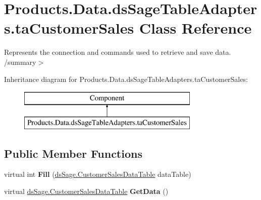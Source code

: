 \hypertarget{class_products_1_1_data_1_1ds_sage_table_adapters_1_1ta_customer_sales}{}\section{Products.\+Data.\+ds\+Sage\+Table\+Adapters.\+ta\+Customer\+Sales Class Reference}
\label{class_products_1_1_data_1_1ds_sage_table_adapters_1_1ta_customer_sales}


Represents the connection and commands used to retrieve and save data. /summary$>$  


Inheritance diagram for Products.\+Data.\+ds\+Sage\+Table\+Adapters.\+ta\+Customer\+Sales\+:\begin{figure}[H]
\begin{center}
\leavevmode
\includegraphics[height=2.000000cm]{class_products_1_1_data_1_1ds_sage_table_adapters_1_1ta_customer_sales}
\end{center}
\end{figure}
\subsection*{Public Member Functions}
\begin{DoxyCompactItemize}
\item 
virtual int {\bfseries Fill} (\hyperlink{class_products_1_1_data_1_1ds_sage_1_1_customer_sales_data_table}{ds\+Sage.\+Customer\+Sales\+Data\+Table} data\+Table)\hypertarget{class_products_1_1_data_1_1ds_sage_table_adapters_1_1ta_customer_sales_a84fe8de24728f553f0961444fbcb0e42}{}\label{class_products_1_1_data_1_1ds_sage_table_adapters_1_1ta_customer_sales_a84fe8de24728f553f0961444fbcb0e42}

\item 
virtual \hyperlink{class_products_1_1_data_1_1ds_sage_1_1_customer_sales_data_table}{ds\+Sage.\+Customer\+Sales\+Data\+Table} {\bfseries Get\+Data} ()\hypertarget{class_products_1_1_data_1_1ds_sage_table_adapters_1_1ta_customer_sales_ac368b67ebfa7346c10aa249891007c6a}{}\label{class_products_1_1_data_1_1ds_sage_table_adapters_1_1ta_customer_sales_ac368b67ebfa7346c10aa249891007c6a}

\end{DoxyCompactItemize}
